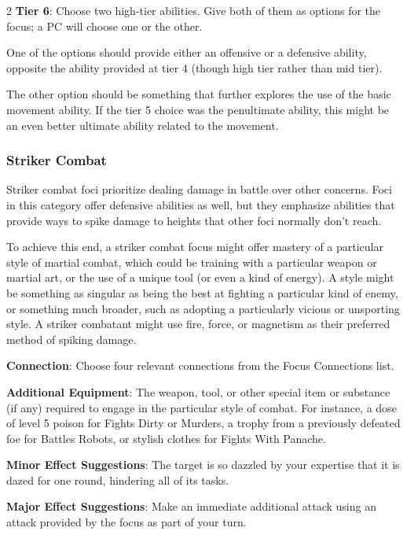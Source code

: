 \begin{multicols}{2}
\textbf{Tier 6}: Choose two high-tier abilities. Give both of them as options for the focus; a PC will choose one or the other.

One of the options should provide either an offensive or a defensive ability, opposite the ability provided at tier 4 (though high tier rather than mid tier).

The other option should be something that further explores the use of the basic movement ability. If the tier 5 choice was the penultimate ability, this might be an even better ultimate ability related to the movement.

\subsubsection{Striker Combat}

Striker combat foci prioritize dealing damage in battle over other concerns. Foci in this category offer defensive abilities as well, but they emphasize abilities that provide ways to spike damage to heights that other foci normally don’t reach.

To achieve this end, a striker combat focus might offer mastery of a particular style of martial combat, which could be training with a particular weapon or martial art, or the use of a unique tool (or even a kind of energy). A style might be something as singular as being the best at fighting a particular kind of enemy, or something much broader, such as adopting a particularly vicious or unsporting style. A striker combatant might use fire, force, or magnetism as their preferred method of spiking damage.

\textbf{Connection}: Choose four relevant connections from the Focus Connections list. 

\textbf{Additional Equipment}: The weapon, tool, or other special item or substance (if any) required to engage in the particular style of combat. For instance, a dose of level 5 poison for Fights Dirty or Murders, a trophy from a previously defeated foe for Battles Robots, or stylish clothes for Fights With Panache.

\textbf{Minor Effect Suggestions}: The target is so dazzled by your expertise that it is dazed for one round, hindering all of its tasks.

\textbf{Major Effect Suggestions}: Make an immediate additional attack using an attack provided by the focus as part of your turn.


\end{multicols}
